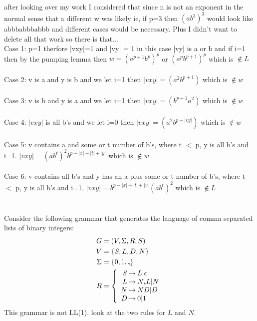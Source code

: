 \documentclass{article}
\begin{document}
after looking over my work I considered that since n is not an exponent in the normal sense that a different w was likely ie, if p=3 then $(ab^3)^3$ would look like abbbabbbabbb and different cases would be necessary. Plus I didn't want to delete all that work so there is that...\\
Case 1: p=1 therfore |vxy|=1 and |vy| = 1 in this case |vy| is a or b and if i=1 then by the pumping lemma then $w=(a^{p+1}b^p)^p$ or $(a^pb^{p+1})^p$ which is $\notin L$\\\\
Case 2: v is a and y is b and we let i=1 then $|vxy|=(a^2b^{p+1})$ which is $\notin w$\\\\
Case 3: v is b and y is a and we let i=1 then $|vxy|=(b^{p+1}a^2)$ which is $\notin w$\\\\
Case 4: $|vxy|$ is all b's and we let i=0 then $|vxy|=(a^2b^{p-|vy|})$ which is $\notin w$\\\\
Case 5: v contains a and some or t number of b's, where t $<$ p,  y is all b's and i=1. $|vxy|= (ab^t)^2b^{p-|x|-|t|+|y|}$ which is $\notin w$\\\\
Case 6: v contains all b's and y has an a plus some or t number of b's, where t $<$ p,  y is all b's and i=1. $|vxy|= b^{p-|x|-|t|+|v|}(ab^t)^2$ which is $\notin L$\\\\
\\
\question%
Consider the following grammar that generates the language of comma separated
lists of binary integers:
\begin{align*}
  G      &= \left(V, \Sigma, R, S \right) \\
  V      &= \left\{S, L, D, N \right\}\\
  \Sigma &= \left\{0,1,\textbf{,}\right\}\\
  R      &= \left\{
           \begin{array}{{r@{\:\rightarrow\:}l}}
             S & L | \epsilon                          \\
             L & N\text{\bf,}L | N                     \\
             N & ND | D                                \\
             D & 0 | 1  \\
           \end{array}
                 \right.\\
\end{align*}
This grammar is not LL(1).  look at the two rules for $L$ and $N$.
\end{document}
